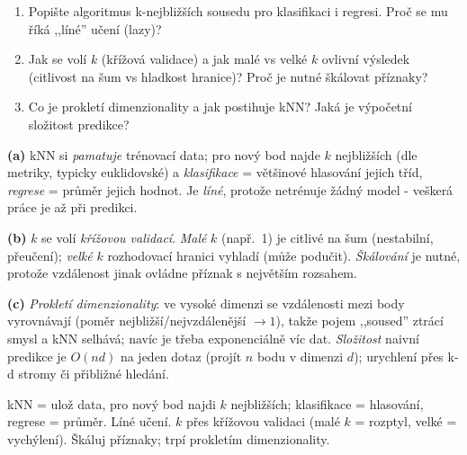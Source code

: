 \begin{zadani}
\begin{enumerate}[label=(\alph*)]
  \item {} Popište algoritmus k-nejbližších sousedu pro klasifikaci i regresi. Proč se mu říká ,,líné'' učení (lazy)?
  \item {} Jak se volí $k$ (křížová validace) a jak malé vs velké $k$ ovlivní výsledek (citlivost na šum vs hladkost hranice)? Proč je nutné škálovat příznaky?
  \item {} Co je prokletí dimenzionality a jak postihuje kNN? Jaká je výpočetní složitost predikce?
\end{enumerate}
\end{zadani}

\begin{reseni}
\textbf{(a)} kNN si \emph{pamatuje} trénovací data; pro nový bod najde $k$ nejbližších (dle metriky, typicky euklidovské) a \emph{klasifikace} = většinové hlasování jejich tříd, \emph{regrese} = průměr jejich hodnot. Je \emph{líné}, protože netrénuje žádný model - veškerá práce je až při predikci.

\textbf{(b)} $k$ se volí \emph{křížovou validací}. \emph{Malé} $k$ (např.\ 1) je citlivé na šum (nestabilní, přeučení); \emph{velké} $k$ rozhodovací hranici vyhladí (může podučit). \emph{Škálování} je nutné, protože vzdálenost jinak ovládne příznak s největším rozsahem.

\textbf{(c)} \emph{Prokletí dimenzionality}: ve vysoké dimenzi se vzdálenosti mezi body vyrovnávají (poměr nejbližší/nejvzdálenější $\to1$), takže pojem ,,soused'' ztrácí smysl a kNN selhává; navíc je třeba exponenciálně víc dat. \emph{Složitost} naivní predikce je $O(nd)$ na jeden dotaz (projít $n$ bodu v dimenzi $d$); urychlení přes k-d stromy či přibližné hledání.
\end{reseni}

\begin{jadro}
kNN = ulož data, pro nový bod najdi $k$ nejbližších; klasifikace = hlasování, regrese = průměr. Líné učení. $k$ přes křížovou validaci (malé $k$ = rozptyl, velké = vychýlení). Škáluj příznaky; trpí prokletím dimenzionality.
\end{jadro}


